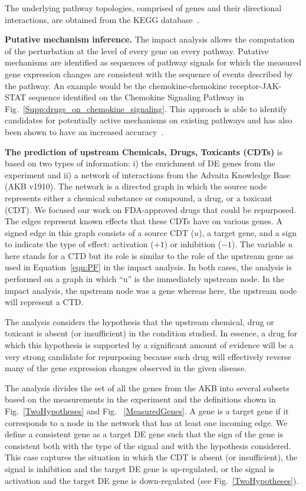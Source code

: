 The underlying pathway topologies, comprised of genes and their directional interactions, are obtained from the KEGG database~\cite{ogata1999kegg, kanehisa2010kegg, kanehisa2012kegg,  kanehisa2014data}.


\textbf{Putative mechanism inference.} The impact analysis  allows the computation of the perturbation at the level of every gene on every pathway. Putative mechanisms are identified as sequences of pathway signals for which the measured gene expression changes are consistent with the sequence of events described by the pathway. An example would be the chemokine-chemokine receptor-JAK-STAT sequence identified on the Chemokine Signaling Pathway  in Fig.~\ref{Supp:drugs_on_chemokine_signaling}. This approach is able to identify candidates for potentially active mechanisms on existing pathways and has also been shown to have an increased accuracy~\cite{nguyen2019identifying}. %


\textbf{The prediction of upstream Chemicals, Drugs, Toxicants (CDTs)} is based on two types of information: i) the enrichment of DE genes from the experiment and ii) a network of interactions from the Advaita Knowledge Base (AKB v1910). The network is a directed graph in which the source node represents either a chemical substance or compound, a drug, or a toxicant (CDT). We focused our work on FDA-approved drugs that could be repurposed. The edges represent known effects that these CDTs have on various genes. A signed edge in this graph consists of a source CDT ($u$), a target gene, and a sign to indicate the type of effect: activation ($+1$) or inhibition ($-1$). 
The variable $u$ here stands for a CTD but its role is similar to the role of the upstream gene as used in Equation~\ref{eqn:PF} in the impact analysis. In both cases, the analysis is performed on a graph in which ``u'' is the immediately upstream node. In the impact analysis, the upstream node was  a gene whereas here, the upstream node will represent a CTD.

The analysis considers the hypothesis that  the upstream chemical, drug or toxicant is absent (or insufficient) in the condition studied. In essence, a drug for which this hypothesis is supported by a significant amount of evidence will be a very strong candidate for repurposing because such drug will effectively reverse many of the gene expression changes observed in the given disease. 


The analysis divides the set of all the genes from the AKB into several subsets based on the measurements in the experiment and the definitions shown in Fig.~\ref{TwoHypotheses} and Fig. ~\ref{MeasuredGenes}. 
A gene is a target gene if it corresponds to a node in the network that has at least one incoming edge. We define a consistent gene as a target DE gene such that the sign of the gene is consistent both with the type of the signal and with the hypothesis considered. 
This case captures the situation in which the CDT is absent (or insufficient), the signal is inhibition and the target DE gene is up-regulated, or the signal is activation and the target DE gene is down-regulated (see Fig.~\ref{TwoHypotheses}).

